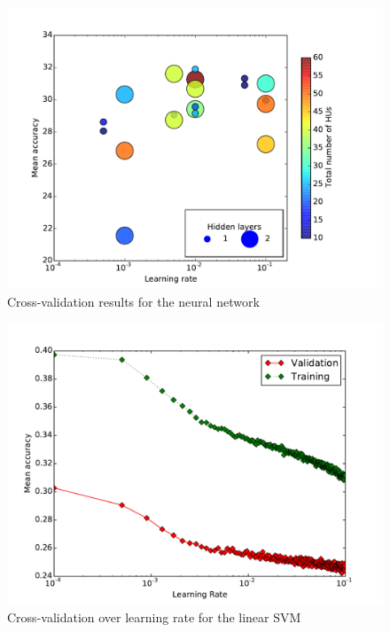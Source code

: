 \documentclass{acm_proc_article-sp}
\begin{document}
\begin{figure}[h!]
	\centering
	\includegraphics[width=\linewidth]{neuralnet_crossval_oddgraph}
	\caption{Cross-validation results for the neural network}
	\label{fig:nn-crossval}
\end{figure}

\begin{figure}[h!]
	\centering
	\includegraphics[width=\linewidth]{SVM_standard_rate2}
	\caption{Cross-validation over learning rate for the linear SVM}
	\label{fig:svm-alpha}
\end{figure}
\end{document}
